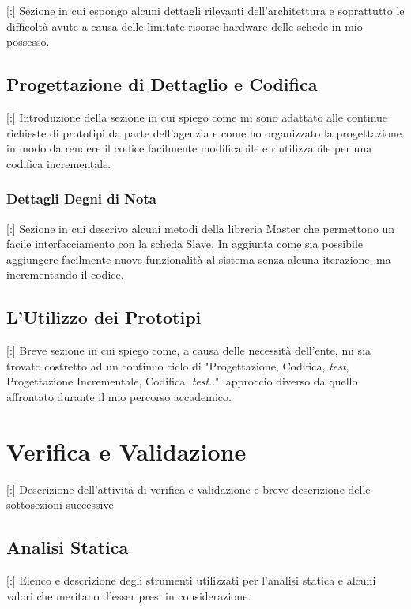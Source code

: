 [:] Sezione in cui espongo alcuni dettagli rilevanti dell'architettura e soprattutto le difficoltà avute a causa delle limitate risorse hardware delle schede in mio possesso.

\subsection{Progettazione di Dettaglio e Codifica}

[:] Introduzione della sezione in cui spiego come mi sono adattato alle continue richieste di prototipi da parte dell'agenzia e come ho organizzato la progettazione in modo da rendere il codice facilmente modificabile e riutilizzabile per una codifica incrementale.

\subsubsection{Dettagli Degni di Nota}

[:] Sezione in cui descrivo alcuni metodi della libreria Master che permettono un facile interfacciamento con la scheda Slave. In aggiunta come sia possibile aggiungere facilmente nuove funzionalità al sistema senza alcuna iterazione, ma incrementando il codice.

\subsection{L'Utilizzo dei Prototipi}

[:] Breve sezione in cui spiego come, a causa delle necessità dell'ente, mi sia trovato costretto ad un continuo ciclo di "Progettazione, Codifica, \textit{test}, Progettazione Incrementale, Codifica, \textit{test}..", approccio diverso da quello affrontato durante il mio percorso accademico.

\section{Verifica e Validazione}

[:] Descrizione dell'attività di verifica e validazione e breve descrizione delle sottosezioni successive

\subsection{Analisi Statica}

[:] Elenco e descrizione degli strumenti utilizzati per l'analisi statica e alcuni valori che meritano d'esser presi in considerazione.

